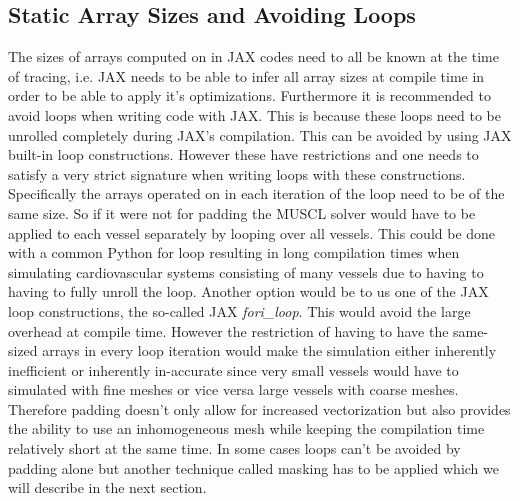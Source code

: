 \documentclass[a4paper, oneside]{discothesis}
\begin{document}
							\subsection{Static Array Sizes and Avoiding Loops} \label{sec:al}
							The sizes of arrays computed on in JAX codes need to all be known at the time of tracing, i.e. JAX needs to be able to infer all array sizes at compile time in order to be able to apply it's optimizations.
							Furthermore it is recommended to avoid loops when writing code with JAX.
							This is because these loops need to be unrolled completely during JAX's compilation.
							This can be avoided by using JAX built-in loop constructions.
							However these have restrictions and one needs to satisfy a very strict signature when writing loops with these constructions.
							Specifically the arrays operated on in each iteration of the loop need to be of the same size.
							So if it were not for padding the MUSCL solver would have to be applied to each vessel separately by looping over all vessels.
							This could be done with a common Python for loop resulting in long compilation times when simulating cardiovascular systems consisting of many vessels due to having to having to fully unroll the loop.
							Another option would be to us one of the JAX loop constructions, the so-called JAX \emph{fori\_loop}.
							This would avoid the large overhead at compile time.
							However the restriction of having to have the same-sized arrays in every loop iteration would make the simulation either inherently inefficient or inherently in-accurate since very small vessels would have to simulated with fine meshes or vice versa large vessels with coarse meshes.
							Therefore padding doesn't only allow for increased vectorization but also provides the ability to use an inhomogeneous mesh while keeping the compilation time relatively short at the same time.
							In some cases loops can't be avoided by padding alone but another technique called masking has to be applied which we will describe in the next section.
\end{document}
